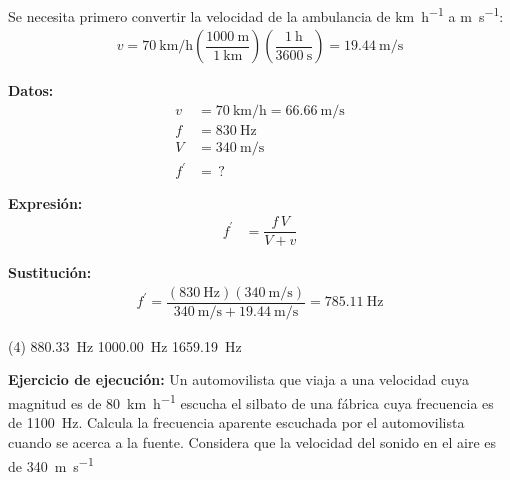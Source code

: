 \documentclass[12pt]{exam}
\begin{document}
\begin{questions}
    \vspace*{0.3cm}
    Se necesita primero convertir la velocidad de la ambulancia de \unit{\kilo\meter\per\hour} a \unit{\meter\per\second}:
    \begin{align*}
    v = \SI[per-mode=fraction]{70}{\kilo\meter\per\hour} \left( \dfrac{\SI{1000}{\meter}}{\SI{1}{\kilo\meter}} \right) \left( \dfrac{\SI{1}{\hour}}{\SI{3600}{\second}} \right) = \SI[per-mode=fraction]{19.44}{\meter\per\second}
    \end{align*}
    
    \vspace*{0.3cm}
    \begin{minipage}[t]{0.35\linewidth}
    \textbf{Datos: }
    \begin{align*}
    v &= \SI{70}{\kilo\meter\per\hour} = \SI{66.66}{\meter\per\second} \\
    f &= \SI{830}{\hertz} \\
    V &= \SI{340}{\meter\per\second} \\
    f^{\prime} &= \, ?
    \end{align*}
    \end{minipage}
    \hspace{1cm}
    \begin{minipage}[t]{0.4\linewidth}
    \textbf{Expresión:}
    \begin{align*}
    f^{\prime} &= \dfrac{f \, V}{V + v}
    \end{align*}
    \end{minipage}

    \vspace*{0.3cm}
    \textbf{Sustitución:}
    \begin{align*}
    f^{\prime} = \dfrac{\left( \SI{830}{\hertz} \right)\left( \displaystyle \SI[per-mode=fraction]{340}{\meter\per\second} \right)}{\displaystyle \SI[per-mode=fraction]{340}{\meter\per\second} + \SI[per-mode=fraction]{19.44}{\meter\per\second}} = \SI{785.11}{\hertz}
    \end{align*}

   \begin{tasks}(4)
    \task {}
    \task \SI{880.33}{\hertz}
    \task \SI{1000.00}{\hertz}
    \task \SI{1659.19}{\hertz}
    \end{tasks}
      
    \setcounter{question}{11} \question \textbf{Ejercicio de ejecución: } Un automovilista que viaja a una velocidad cuya magnitud es de \SI{80}{\kilo\meter\per\hour} escucha el silbato de una fábrica cuya frecuencia es de \SI{1100}{\hertz}. Calcula la frecuencia aparente escuchada por el automovilista cuando se acerca a la fuente. Considera que la velocidad del sonido en el aire es de \SI{340}{\meter\per\second}


\end{questions}
\end{document}
